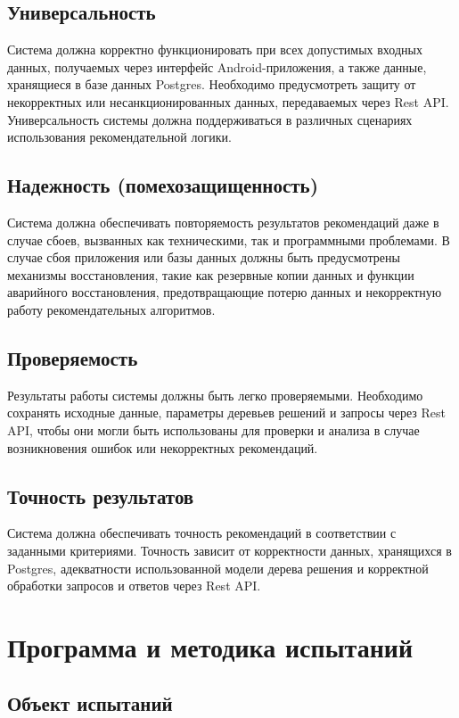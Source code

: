 \subsection{Универсальность}
Система должна корректно функционировать при всех допустимых входных данных, получаемых через интерфейс Android-приложения, а также данные, хранящиеся в базе данных Postgres. Необходимо предусмотреть защиту от некорректных или несанкционированных данных, передаваемых через Rest API. Универсальность системы должна поддерживаться в различных сценариях использования рекомендательной логики.

\subsection{Надежность (помехозащищенность)}
Система должна обеспечивать повторяемость результатов рекомендаций даже в случае сбоев, вызванных как техническими, так и программными проблемами. В случае сбоя приложения или базы данных должны быть предусмотрены механизмы восстановления, такие как резервные копии данных и функции аварийного восстановления, предотвращающие потерю данных и некорректную работу рекомендательных алгоритмов.

\subsection{Проверяемость}
Результаты работы системы должны быть легко проверяемыми. Необходимо сохранять исходные данные, параметры деревьев решений и запросы через Rest API, чтобы они могли быть использованы для проверки и анализа в случае возникновения ошибок или некорректных рекомендаций.

\subsection{Точность результатов}
Система должна обеспечивать точность рекомендаций в соответствии с заданными критериями. Точность зависит от корректности данных, хранящихся в Postgres, адекватности использованной модели дерева решения и корректной обработки запросов и ответов через Rest API.
\section{Программа и методика испытаний}

\subsection{Объект испытаний}

